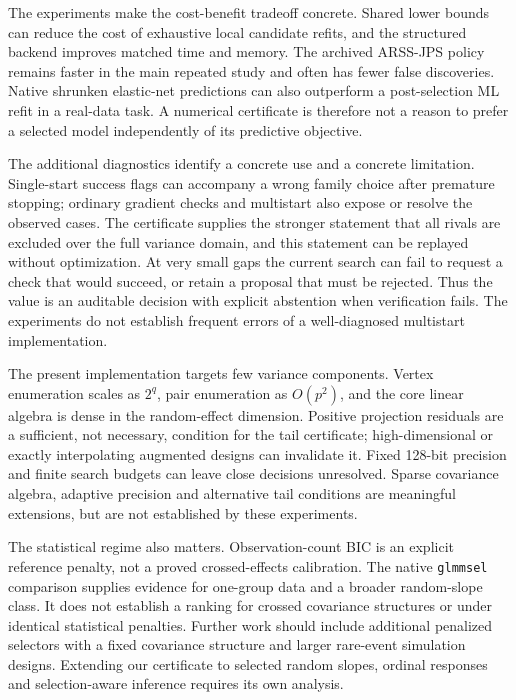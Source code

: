 \documentclass[preprint,11pt,numbers]{elsarticle}
\theoremstyle{remark}\newtheorem{remark}[theorem]{Remark}
\begin{document}
The experiments make the cost-benefit tradeoff concrete. Shared lower bounds
can reduce the cost of exhaustive local candidate refits, and the structured
backend improves matched time and memory. The archived ARSS-JPS policy remains
faster in the main repeated study and often has fewer false discoveries. Native
shrunken elastic-net predictions can also outperform a post-selection ML refit
in a real-data task. A numerical certificate is therefore not a reason to
prefer a selected model independently of its predictive objective.

The additional diagnostics identify a concrete use and a concrete limitation.
Single-start success flags can accompany a wrong family choice after premature
stopping; ordinary gradient checks and multistart also expose or resolve the
observed cases. The certificate supplies the stronger statement that all
rivals are excluded over the full variance domain, and this statement can be
replayed without optimization. At very small gaps the current search can fail
to request a check that would succeed, or retain a proposal that must be
rejected. Thus the value is an auditable decision with explicit abstention
when verification fails. The experiments do not establish frequent errors of
a well-diagnosed multistart implementation.

The present implementation targets few variance components. Vertex enumeration
scales as $2^q$, pair enumeration as $O(p^2)$, and the core linear algebra is
dense in the random-effect dimension. Positive projection residuals are a
sufficient, not necessary, condition for the tail certificate; high-dimensional
or exactly interpolating augmented designs can invalidate it. Fixed 128-bit
precision and finite search budgets can leave close decisions unresolved.
Sparse covariance algebra, adaptive precision and alternative tail conditions
are meaningful extensions, but are not established by these experiments.

The statistical regime also matters. Observation-count BIC is an explicit
reference penalty, not a proved crossed-effects calibration. The native
\texttt{glmmsel} comparison supplies evidence for one-group data and a broader
random-slope class. It does not establish a ranking for crossed covariance
structures or under identical statistical penalties. Further work should
include additional penalized selectors with a fixed covariance structure and
larger rare-event simulation designs. Extending our certificate to selected
random slopes, ordinal responses and selection-aware inference requires its
own analysis.
\end{document}
